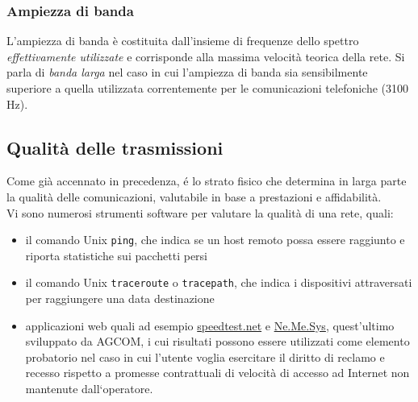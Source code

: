 \documentclass[a4paper,11pt]{article}
\def\code#1{\texttt{#1}}
\def\subsub#1{\subsubsection{#1}\label{#1}}
\begin{document}
\subsub{Ampiezza di banda}
L'ampiezza di banda è costituita dall'insieme di frequenze dello spettro \textit{effettivamente utilizzate} e corrisponde alla massima velocità teorica della rete. Si parla di \textit{banda larga} nel caso in cui l'ampiezza di banda sia sensibilmente superiore a quella utilizzata correntemente per le comunicazioni telefoniche (3100 Hz).

\subsection{Qualità delle trasmissioni} \label{qualita}
Come già accennato in precedenza, é lo strato fisico che determina in larga parte la qualità delle comunicazioni, valutabile in base a prestazioni e affidabilità. 
\\Vi sono numerosi strumenti software per valutare la qualità di una rete, quali:
\begin{itemize}
\item il comando Unix \code{ping}, che indica se un host remoto possa essere raggiunto e riporta statistiche sui pacchetti persi 
\item il comando Unix \code{traceroute} o \code{tracepath}, che indica i dispositivi attraversati per raggiungere una data destinazione
\item applicazioni web quali ad esempio \url{speedtest.net} e \href{<https://www.misurainternet.it/>}{Ne.Me.Sys}, quest'ultimo sviluppato da AGCOM, i cui risultati possono essere utilizzati come elemento probatorio nel caso in cui l’utente voglia esercitare il diritto di reclamo e recesso rispetto a promesse contrattuali di velocità di accesso ad Internet non mantenute dall‘operatore.
\end{itemize}
\end{document}
